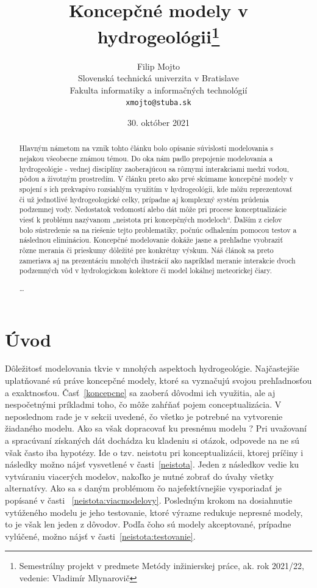 \documentclass[10pt,twoside,slovak, a4paper]{article}
\title{Koncepčné modely v hydrogeológii\thanks{Semestrálny projekt v predmete Metódy inžinierskej práce, ak. rok 2021/22, vedenie: Vladimír Mlynarovič}}
\author{Filip Mojto\\[2pt]
	{\small Slovenská technická univerzita v Bratislave}\\
	{\small Fakulta informatiky a informačných technológií}\\
	{\small \texttt{xmojto@stuba.sk}}
	}
\date{\small 30. október 2021}
\begin{document}
\maketitle

\begin{abstract}
Hlavným námetom na vznik tohto článku bolo opísanie súvislosti modelovania s nejakou všeobecne známou témou. Do oka nám padlo prepojenie modelovania a hydrogeológie - vednej disciplíny zaoberajúcou sa rôznymi interakciami medzi vodou, pôdou a životným prostredím. V článku preto ako prvé skúmame koncepčné modely v spojení s ich prekvapivo rozsiahlým využitím v hydrogeológii, kde môžu reprezentovať či už jednotlivé hydrogeologické celky, prípadne aj komplexný systém prúdenia podzemnej vody. Nedostatok vedomostí alebo dát môže pri procese konceptualizácie viesť k problému nazývanom „neistota pri koncepčných modeloch“. Ďalším z cieľov bolo sústredenie sa na riešenie tejto problematiky, počnúc odhalením pomocou testov a následnou elimináciou. Koncepčné modelovanie dokáže jasne a prehľadne vyobraziť rôzne merania či prieskumy dôležité pre konkrétny výskum. Náš článok sa preto zameriava aj na prezentáciu mnohých ilustrácií ako napríklad meranie interakcie dvoch podzemných vôd v hydrologickom kolektore či model lokálnej meteorickej čiary.

\ldots
\end{abstract}

\newpage

\section{Úvod}

Dôležitosť modelovania tkvie v mnohých aspektoch hydrogeológie. Najčastejšie uplatňované sú práve koncepčné modely, ktoré sa vyznačujú svojou prehľadnosťou a exaktnosťou. Časť~\ref{koncepcne} sa zaoberá dôvodmi ich využitia, ale aj nespočetnými príkladmi toho, čo môže zahŕňať pojem conceptualizácia. V neposlednom rade je v sekcii uvedené, čo všetko je potrebné na vytvorenie žiadaného modelu. Ako sa však dopracovať ku presnému modelu ? Pri uvažovaní a spracúvaní získaných dát dochádza ku kladeniu si otázok, odpovede na ne sú však často iba hypotézy. Ide o tzv. neistotu pri konceptualizácii, ktorej príčiny i následky možno nájsť vysvetlené v časti~\ref{neistota}. Jeden z následkov vedie ku vytváraniu viacerých modelov, nakoľko je nutné zobrať do úvahy všetky alternatívy. Ako sa s daným problémom čo najefektívnejšie vysporiadať je popísané v časti ~\ref{neistota:viacmodelovy}. Posledným krokom na dosiahnutie vytúženého modelu je jeho testovanie, ktoré výrazne redukuje nepresné modely, to je však len jeden z dôvodov. Podľa čoho sú modely akceptované, prípadne vylúčené, možno nájsť v časti~\ref{neistota:testovanie}.
\end{document}
